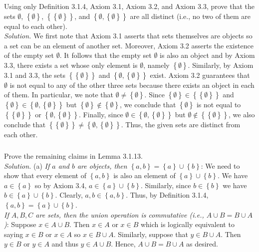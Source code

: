 \documentclass{amsart}
\theoremstyle{definition}
\newcommand{\soln}{\newline\textit{Solution.} }
\newcommand{\set}[1]{\left\{#1\right\}}
\begin{document}
\subsubsection{} Using only Definition 3.1.4, Axiom 3.1, Axiom 3.2, and Axiom 3.3, prove that the sets $\emptyset$, $\set{\emptyset}$, $\set{\set{\emptyset}}$, and $\set{\emptyset, \set{\emptyset}}$ are all distinct (i.e., no two of them are equal to each other). \\
\soln We first note that Axiom 3.1 asserts that sets themselves are objects so a set can be an element of another set. Moreover, Axiom 3.2 asserts the existence of the empty set $\emptyset$. It follows that the empty set $\emptyset$ is also an object and by Axiom 3.3, there exists a set whose only element is $\emptyset$, namely $\set{\emptyset}$. Similarly, by Axiom 3.1 and 3.3, the sets $\set{\set{\emptyset}}$ and $\set{\emptyset,\set{\emptyset}}$ exist. Axiom 3.2 guarantees that $\emptyset$ is not equal to any of the other three sets because there exists an object in each of them. In particular, we note that $\emptyset\neq\set{\emptyset}$. Since $\set{\emptyset}\in\set{\set{\emptyset}}$ and $\set{\emptyset}\in\set{\emptyset,\set{\emptyset}}$ but $\set{\emptyset}\notin\set{\emptyset}$, we conclude that $\set{\emptyset}$ is not equal to $\set{\set{\emptyset}}$ or $\set{\emptyset,\set{\emptyset}}$. Finally, since $\emptyset\in\set{\emptyset,\set{\emptyset}}$ but $\emptyset\notin\set{\set{\emptyset}}$, we also conclude that $\set{\set{\emptyset}}\neq \set{\emptyset,\set{\emptyset}}$. Thus, the given sets are distinct from each other. \\

\subsubsection{} Prove the remaining claims in Lemma 3.1.13. \\
\soln (a) \textit{If $a$ and $b$ are objects, then $\set{a,b}=\set{a}\cup\set{b}$}: We need to show that every element of $\set{a,b}$ is also an element of $\set{a}\cup\set{b}$. We have $a\in\set{a}$ so by Axiom 3.4, $a\in\set{a}\cup\set{b}$. Similarly, since $b\in\set{b}$ we have $b\in\set{a}\cup\set{b}$. Clearly, $a,b\in\set{a,b}$. Thus, by Definition 3.1.4, $\set{a,b}=\set{a}\cup\set{b}$. \\

\textit{If $A,B,C$ are sets, then the union operation is commutative (i.e., $A\cup B=B\cup A$)}: Suppose $x\in A\cup B$. Then $x\in A$ or $x\in B$ which is logically equivalent to saying $x\in B$ or $x\in A$ so $x\in B\cup A$. Similarly, suppose that $y\in B\cup A$. Then $y\in B$ or $y\in A$ and thus $y\in A\cup B$. Hence, $A\cup B=B\cup A$ as desired. \\
\end{document}
